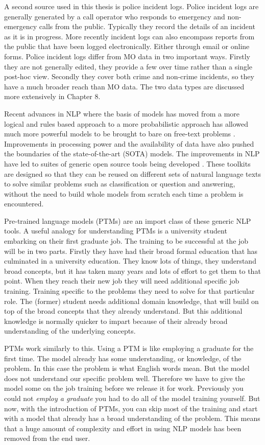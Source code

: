 A second source used in this thesis is police incident logs. Police incident logs are generally generated by a call operator who responds to emergency and non-emergency calls from the public. Typically they record the details of an incident as it is in progress. More recently incident logs can also encompass reports from the public that have been logged electronically. Either through email or online forms. Police incident logs differ from MO data in two important ways. Firstly they are not generally edited, they provide a few over time rather than a single post-hoc view. Secondly they cover both crime and non-crime incidents, so they have a much broader reach than MO data. The two data types are discussed more extensively in Chapter 8.

Recent advances in NLP where the basis of models has moved from a more logical and rules based approach to a more probabilistic approach has allowed much more powerful models to be brought to bare on free-text problems \parencite{kumar2011natural}. Improvements in processing power and the availability of data have also pushed the boundaries of the state-of-the-art (SOTA) models. The improvements in NLP have led to suites of generic open source tools being developed  \parencite{manning2014stanford, benoit2018quanteda, loper2002nltk}. These toolkits are designed so that they can be reused on different sets of natural language texts to solve similar problems such as classification or question and answering, without the need to build whole models from scratch each time a problem is encountered.

Pre-trained language models (PTMs) are an import class of these generic NLP tools. A useful analogy for understanding PTMs is a university student embarking on their first graduate job. The training to be successful at the job will be in two parts. Firstly they have had their broad formal education that has culminated in a university education. They know lots of things, they understand broad concepts, but it has taken many years and lots of effort to get them to that point. When they reach their new job they will need additional specific job training. Training specific to the problems they need to solve for that particular role. The (former) student needs additional domain knowledge, that will build on top of the broad concepts that they already understand. But this additional knowledge is normally quicker to impart because of their already broad understanding of the underlying concepts.  

PTMs work similarly to this. Using a PTM is like employing a graduate for the first time. The model already has some understanding, or knowledge, of the problem. In this case the problem is what English words mean. But the model does not understand our specific problem well. Therefore we have to give the model some on the job training before we release it for work. Previously you could not \emph{employ a graduate} you had to do all of the model training yourself. But now, with the introduction of PTMs,  you can skip most of the training and start with a model that already has a broad understanding of the problem. This means that a huge amount of complexity and effort in using NLP models has been removed from the end user. 

